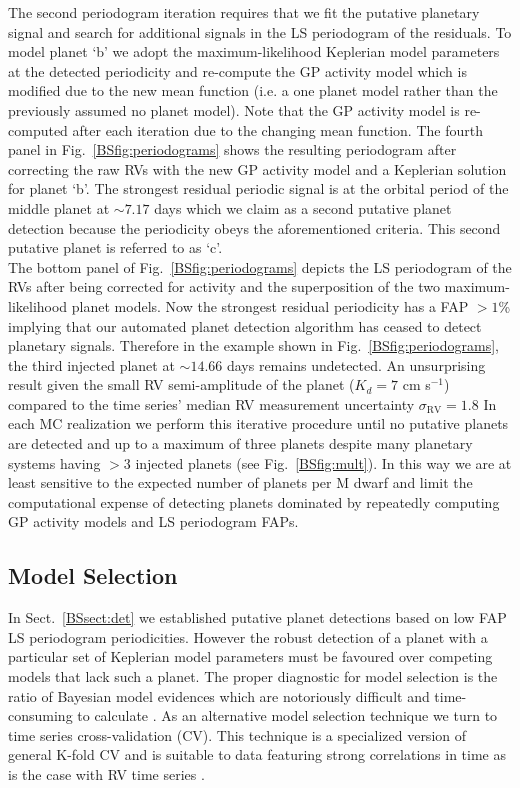 The second periodogram iteration requires that we fit the putative planetary signal and search for
additional signals in the LS periodogram of the residuals. To model planet `b'
we adopt the maximum-likelihood Keplerian model parameters at the detected periodicity
and re-compute the GP activity model which is modified due to the new mean function (i.e. a one planet model
rather than the previously assumed no planet model). Note that the GP activity model is re-computed after each
iteration due to the changing mean function. The fourth panel in Fig.~\ref{BSfig:periodograms} shows
the resulting periodogram after correcting the raw RVs with the new GP activity model and a Keplerian solution
for planet `b'. The strongest residual
periodic signal is at the orbital period of the middle planet at $\sim 7.17$ days which
we claim as a second putative planet detection because the periodicity obeys the aforementioned criteria.
This second putative planet is referred to as `c'. \\

The bottom panel of Fig.~\ref{BSfig:periodograms} depicts the LS periodogram of the RVs after being
corrected for activity and the superposition of the two maximum-likelihood planet models. Now the strongest
residual periodicity has a FAP $>1$\% implying that our automated planet detection algorithm has ceased to
detect planetary signals. Therefore in the example shown in Fig.~\ref{BSfig:periodograms}, the
third injected planet at $\sim 14.66$ days remains undetected. An unsurprising result given the small RV
semi-amplitude of the planet ($K_d=7$ cm s$^{-1}$) compared to the time series' median RV measurement
uncertainty $\sigma_{\text{RV}}=1.8$  In each MC realization we perform this iterative procedure
until no putative planets are detected and up to
a maximum of three planets despite many planetary systems having $>3$ injected planets
(see Fig.~\ref{BSfig:mult}). In this way we are at least
sensitive to the expected number of planets per M dwarf \citep[$2.5 \pm 0.2$;][]{dressing15a} 
and limit the computational expense of detecting planets dominated by repeatedly computing GP activity
models and LS periodogram FAPs.


\subsection{Model Selection} \label{BSsect:CV}
In Sect.~\ref{BSsect:det} we established putative planet detections based on low FAP LS periodogram
periodicities. However the robust detection of a planet with a particular set of Keplerian model parameters
must be favoured over competing models that lack such a planet. The proper diagnostic for model
selection is the ratio of Bayesian model evidences which are
notoriously difficult and time-consuming to calculate \citep{ford07}. 
As an alternative model selection technique we turn to time series
cross-validation (CV). This technique is a specialized version of general K-fold CV
and is suitable to data featuring strong correlations in time as is the case with RV time series
\citep{arlot10}. \\

